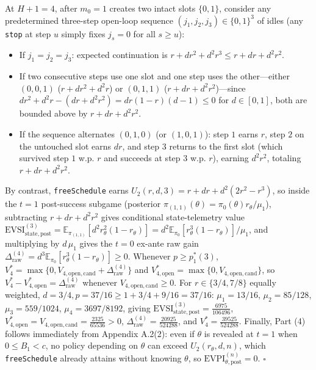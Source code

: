 \documentclass[11pt,a4paper]{article}
\providecommand{\tightlist}{\setlength{\itemsep}{2pt}\setlength{\parskip}{0pt}}
\begin{document}
At \(H+1 = 4\), after \(m_0 = 1\) creates two intact slots \(\{0, 1\}\),
consider any predetermined three-step open-loop sequence
\((j_1, j_2, j_3) \in \{0, 1\}^3\) of idles (any \texttt{stop} at step
\(u\) simply fixes \(j_s = 0\) for all \(s \ge u\)):

\begin{itemize}
\tightlist
\item
  If \(j_1 = j_2 = j_3\): expected continuation is
  \(r + d r^2 + d^2 r^3 \le r + d r + d^2 r^2\).
\item
  If two consecutive steps use one slot and one step uses the
  other---either \((0,0,1)\) (\(r + d r^2 + d^2 r\)) or \((0,1,1)\)
  (\(r + d r + d^2 r^2\))---since
  \(d r^2 + d^2 r - (d r + d^2 r^2) = d r(1-r)(d - 1) \le 0\) for
  \(d \in [0,1]\), both are bounded above by \(r + d r + d^2 r^2\).
\item
  If the sequence alternates \((0, 1, 0)\) (or \((1, 0, 1)\)): step
  \(1\) earns \(r\), step \(2\) on the untouched slot earns \(d r\), and
  step \(3\) returns to the first slot (which survived step \(1\) w.p.
  \(r\) and succeeds at step \(3\) w.p. \(r\)), earning \(d^2 r^2\),
  totaling \(r + d r + d^2 r^2\).
\end{itemize}

By contrast, \texttt{freeSchedule} earns
\(U_2(r, d, 3) = r + d r + d^2(2r^2 - r^3)\), so inside the \(t = 1\)
post-success subgame (posterior
\(\pi_{(1,1)}(\theta) = \pi_0(\theta)r_\theta/\mu_1\)), subtracting
\(r + dr + d^2 r^2\) gives conditional state-telemetry value
\(\mathrm{EVSI}_{\mathrm{state,post}}^{(3)} = \mathbb{E}_{\pi_{(1,1)}}[d^2 r_\theta^2(1 - r_\theta)] = d^2\mathbb{E}_{\pi_0}[r_\theta^3(1 - r_\theta)]/\mu_1\),
and multiplying by \(d\,\mu_1\) gives the \(t = 0\) ex-ante raw gain
\(\Delta_{\mathrm{raw}}^{(4)} = d^3 \mathbb{E}_{\pi_0}[r_\theta^3(1 - r_\theta)] \ge 0\).
Whenever \(p \ge p_1^*(3)\),
\(V_4^* = \max\{0, V_{4,\mathrm{open,cand}} + \Delta_{\mathrm{raw}}^{(4)}\}\)
and \(V_{4,\mathrm{open}}^* = \max\{0, V_{4,\mathrm{open,cand}}\}\), so
\(V_4^* - V_{4,\mathrm{open}}^* = \Delta_{\mathrm{raw}}^{(4)}\) whenever
\(V_{4,\mathrm{open,cand}} \ge 0\). For \(r \in \{3/4, 7/8\}\) equally
weighted, \(d = 3/4, p = 37/16 \ge 1 + 3/4 + 9/16 = 37/16\):
\(\mu_1 = 13/16\), \(\mu_2 = 85/128\), \(\mu_3 = 559/1024\),
\(\mu_4 = 3697/8192\), giving
\(\mathrm{EVSI}_{\mathrm{state,post}}^{(3)} = \frac{6975}{106496}\),
\(V_{4,\mathrm{open}}^* = V_{4,\mathrm{open,cand}} = \frac{2325}{65536} > 0\),
\(\Delta_{\mathrm{raw}}^{(4)} = \frac{20925}{524288}\), and
\(V_4^* = \frac{39525}{524288}\). Finally, Part (4) follows immediately
from Appendix A.2(2): even if \(\theta\) is revealed at \(t = 1\) when
\(0 \le B_1 < c\), no policy depending on \(\theta\) can exceed
\(U_2(r_\theta, d, n)\), which \texttt{freeSchedule} already attains
without knowing \(\theta\), so
\(\mathrm{EVPI}_{\theta,\mathrm{post}}^{(n)} = 0\). \(\square\)
\end{document}
